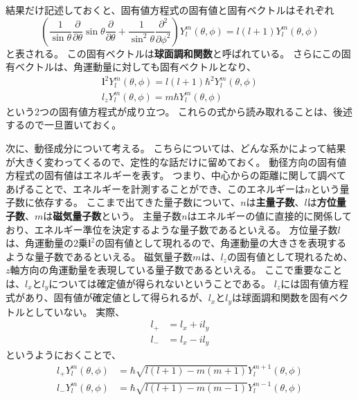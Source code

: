\documentclass[a4paper]{jsreport}
\begin{document}
            結果だけ記述しておくと、固有値方程式の固有値と固有ベクトルはそれぞれ
            \begin{equation}
                \left( \frac{1}{\sin \theta} \frac{\partial}{\partial \theta} \sin \theta \frac{\partial}{\partial \theta} + \frac{1}{\sin^2 \theta} \frac{\partial^2}{\partial\phi^2} \right) Y_l^m(\theta, \phi) = l(l+1) Y_l^m(\theta, \phi)
            \end{equation}
            と表される。
            この固有ベクトルは\textbf{球面調和関数}と呼ばれている。
            さらにこの固有ベクトルは、角運動量に対しても固有ベクトルとなり、
            \begin{align}
                \boldsymbol{l}^2 Y_l^m(\theta, \phi) = l(l+1) \hbar^2 Y_l^m(\theta, \phi) \\
                l_z Y_l^m(\theta, \phi) = m \hbar Y_l^m(\theta, \phi)
            \end{align}
            という2つの固有値方程式が成り立つ。
            これらの式から読み取れることは、後述するので一旦置いておく。\par
            次に、動径成分について考える。
            こちらについては、どんな系かによって結果が大きく変わってくるので、定性的な話だけに留めておく。
            動径方向の固有値方程式の固有値はエネルギーを表す。
            つまり、中心からの距離に関して調べてあげることで、エネルギーを計測することができ、このエネルギーは$n$という量子数に依存する。
            ここまで出てきた量子数について、$n$は\textbf{主量子数}、$l$は\textbf{方位量子数}、$m$は\textbf{磁気量子数}という。
            主量子数$n$はエネルギーの値に直接的に関係しており、エネルギー準位を決定するような量子数であるといえる。
            方位量子数$l$は、角運動量の2乗$\boldsymbol{l}^2$の固有値として現れるので、角運動量の大きさを表現するような量子数であるといえる。
            磁気量子数$m$は、$l_z$の固有値として現れるため、$z$軸方向の角運動量を表現している量子数であるといえる。
            ここで重要なことは、$l_x$と$l_y$については確定値が得られないということである。
            $l_z$には固有値方程式があり、固有値が確定値として得られるが、$l_x$と$l_y$は球面調和関数を固有ベクトルとしていない。
            実際、
            \begin{align}
                l_+ &= l_x + i l_y \\
                l_- &= l_x - i l_y
            \end{align}
            というようにおくことで、
            \begin{align}
                l_+ Y_l^m(\theta, \phi) &= \hbar \sqrt{l(l+1) - m(m+1)} Y_l^{m+1}(\theta, \phi) \\
                l_- Y_l^m(\theta, \phi) &= \hbar \sqrt{l(l+1) - m(m-1)} Y_l^{m-1}(\theta, \phi)
            \end{align}
\end{document}
